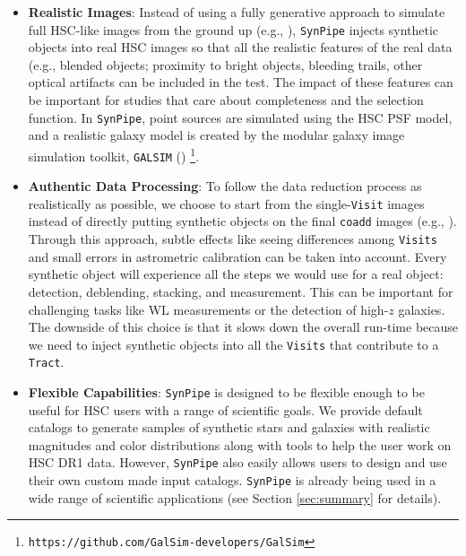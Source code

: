 \documentclass[useamsfonts]{pasj01}
\def\synpipe{\texttt{SynPipe}}
\def\coadd{\texttt{coadd}}
\def\tract{\texttt{Tract}}
\def\visit{\texttt{Visit}}
\def\visits{\texttt{Visits}}
\def\galsim{\texttt{G}{\scriptsize \texttt{AL}}\texttt{S}{\scriptsize \texttt{IM}}}
\begin{document}
    \begin{itemize}

        \item \textbf{Realistic Images}:
            Instead of using a fully generative approach to simulate full HSC-like
            images from the ground up (e.g., \citealt{Chang2015}), \synpipe{} injects
            synthetic objects into real HSC images so that all the realistic
            features of the real data (e.g., blended objects; proximity to bright
            objects, bleeding trails, other optical artifacts can be included in the
            test.
            The impact of these features can be important for studies that care about completeness and the selection
            function.
            In \synpipe{}, point sources are simulated using the HSC PSF model,
            and a realistic galaxy model is created by the modular galaxy image
            simulation toolkit, \galsim{} (\citealt{Rowe2015})
            \footnote{\texttt{https://github.com/GalSim-developers/GalSim}}.

        \item \textbf{Authentic Data Processing}:
            To follow the data reduction process as realistically as possible, we choose to
            start from the single-\visit{} images instead of directly putting synthetic
            objects on the final \coadd{} images (e.g., \citealt{Suchyta2016}).
            Through this approach, subtle effects like seeing differences among
            \visits{} and small errors in astrometric calibration can be taken
            into account.
            Every synthetic object will experience all the steps we would use for a real object: detection, deblending, stacking, and measurement.
            This can be important for challenging tasks like WL measurements
            or the detection of high-$z$ galaxies.
            The downside of this choice is that it slows down the overall run-time because we need to inject synthetic objects into all the \visits{} that contribute to a \tract{}.
        \item \textbf{Flexible Capabilities}: \synpipe{} is designed to be flexible enough to be useful for HSC users with a range of scientific goals.
            We provide default catalogs to generate samples of synthetic stars
            and galaxies with realistic magnitudes and color distributions along with
            tools to help the user work on HSC DR1 data. However, \synpipe{} also easily allows users to  design and use their own custom made input catalogs.
            \synpipe{} is already being used in a wide range of
            scientific applications (see Section \ref{sec:summary} for details).

    \end{itemize}
\end{document}
